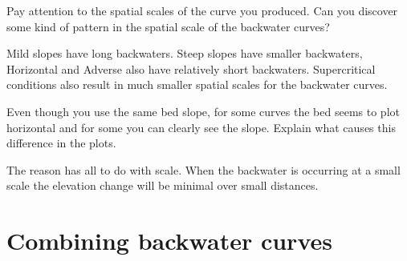 \documentclass[a4paper]{article}
\begin{document}
\begin{solution}
    
\end{solution}

\begin{exercise}
  Pay attention to the spatial scales of the curve you produced. Can you discover some kind of pattern in the spatial scale of the backwater curves?
\end{exercise}

\begin{solution}
    Mild slopes have long backwaters. Steep slopes have smaller backwaters, Horizontal and Adverse also have relatively short backwaters. Supercritical conditions also result in much smaller spatial scales for the backwater curves.
\end{solution}

\begin{exercise}
  Even though you use the same bed slope, for some curves the bed seems to plot horizontal and for some you can clearly see the slope. Explain what causes this difference in the plots.
\end{exercise}

\begin{solution}
    The reason has all to do with scale. When the backwater is occurring at a small scale the elevation change will be minimal over small distances.
\end{solution}

\section{Combining backwater curves}
\end{document}
